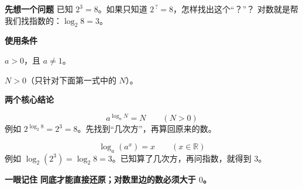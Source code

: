 \begin{statementbox}
	\textbf{\textcolor{CStatement}{先想一个问题}}
	已知 $2^3=8$。如果只知道 $2^{\,?}=8$，怎样找出这个“？”？
	对数就是帮我们找指数的：$\log_2 8=3$。

\begin{center}

\end{center}

	\medskip
	\textbf{\textcolor{CStatement}{使用条件}}
	\begin{description}[style=nextline, leftmargin=2.8em, labelsep=0.5em, itemsep=0.35em]
		\item[\textbf{底数：}] $a>0$，且 $a\neq 1$。
		\item[\textbf{真数：}] $N>0$（只针对下面第一式中的 $N$）。
	\end{description}

	\textbf{\textcolor{CStatement}{两个核心结论}}
	\begin{description}[style=nextline, leftmargin=2.8em, labelsep=0.5em, itemsep=0.45em]
		\item[\textbf{先取对数，再算指数：}]
			\[
				\boxed{a^{\log_a N}=N}\qquad (N>0)
			\]
			例如 $2^{\log_2 8}=2^3=8$。先找到“几次方”，再算回原来的数。
		\item[\textbf{先算指数，再取对数：}]
			\[
				\boxed{\log_a(a^x)=x}\qquad (x\in\mathbb{R})
			\]
			例如 $\log_2(2^3)=\log_2 8=3$。已知算了几次方，再问指数，就得到 $3$。
	\end{description}

	\textbf{\textcolor{CStatement}{一眼记住}}
	\textbf{同底才能直接还原；对数里边的数必须大于 $0$。}
\end{statementbox}
